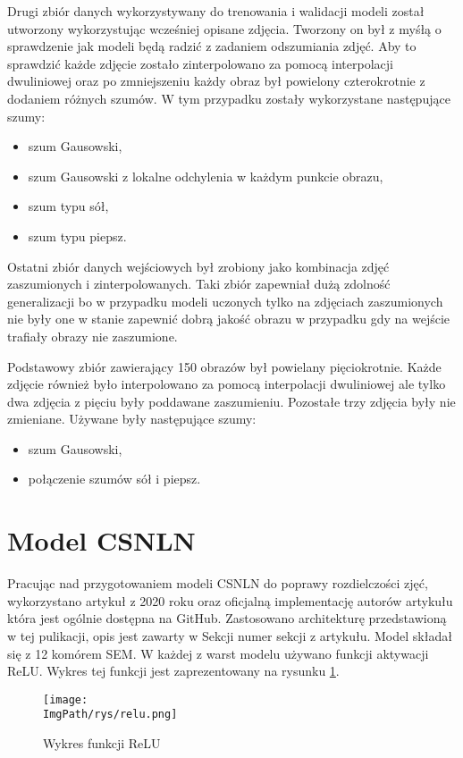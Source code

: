 \documentclass[a4paper,12pt,twoside,openany]{report}
\newcommand{\ImgPath}{.}
\begin{document}
Drugi zbiór danych wykorzystywany do trenowania i walidacji modeli został utworzony wykorzystując wcześniej opisane zdjęcia. Tworzony on był z myśłą o sprawdzenie jak modeli będą radzić z zadaniem odszumiania zdjęć. Aby to sprawdzić każde zdjęcie zostało zinterpolowano za pomocą interpolacji dwuliniowej oraz po zmniejszeniu każdy obraz był powielony czterokrotnie z dodaniem różnych szumów. W tym przypadku zostały wykorzystane następujące szumy:
\begin{itemize}
	\item szum Gausowski,
	\item szum Gausowski z lokalne odchylenia w każdym punkcie obrazu,
	\item szum typu sół,
	\item szum typu piepsz.
\end{itemize} 

Ostatni zbiór danych wejściowych był zrobiony jako kombinacja zdjęć zaszumionych i  zinterpolowanych. Taki zbiór zapewniał dużą zdolność generalizacji bo w przypadku modeli uczonych tylko na zdjęciach zaszumionych nie były one w stanie zapewnić dobrą jakość obrazu w przypadku gdy na wejście trafiały obrazy nie zaszumione. 

Podstawowy zbiór zawierający 150 obrazów był powielany pięciokrotnie. Każde zdjęcie również było interpolowano za pomocą interpolacji dwuliniowej ale tylko dwa zdjęcia z pięciu były  poddawane zaszumieniu. Pozostałe trzy zdjęcia były nie zmieniane. Używane były następujące szumy:
\begin{itemize}
 	\item szum Gausowski,
 	\item połączenie szumów sół i piepsz.
\end{itemize} 

\section{Model CSNLN}
\label{Model CSNLN}
Pracując nad przygotowaniem modeli CSNLN do poprawy rozdielczości zjęć, wykorzystano artykuł z 2020 roku oraz oficjalną implementację autorów artykułu która jest ogólnie dostępna na GitHub. Zastosowano architekturę przedstawioną w tej pulikacji, opis jest zawarty w Sekcji numer sekcji z artykułu. Model składał się z 12 komórem SEM. W każdej  z warst modelu używano funkcji aktywacji ReLU. Wykres tej funkcji jest zaprezentowany na rysunku \ref{relu}.
\begin{figure}[!htbp]
	\begin{center}
		\centering
		\texttt{[image: \\ImgPath/rys/relu.png]}
	\end{center}
	\caption{Wykres funkcji ReLU}
	\label{relu}
\end{figure}    
\end{document}
